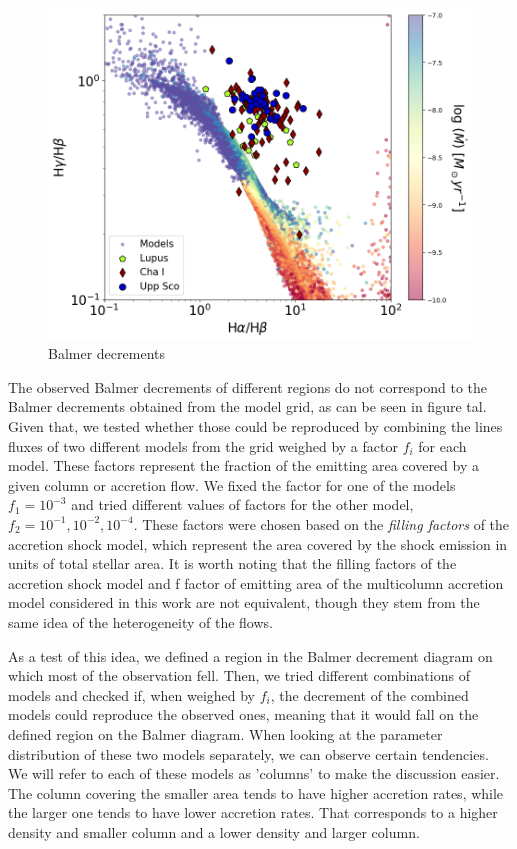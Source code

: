 \documentclass[twocolumn,linenumbers]{aastex631}
\begin{document}
\begin{figure}
    \centering
    \includegraphics[width=0.8\linewidth]{figures/BalmerDecrements.png}
    \caption{Balmer decrements}
    \label{fig:balmer_decrement}
\end{figure}

The observed Balmer decrements of different regions do not correspond to the Balmer decrements obtained from the model grid, as can be seen in figure tal. Given that, we tested whether those could be reproduced by combining the lines fluxes of two different models from the grid weighed by a factor $f_i$ for each model. These factors represent the fraction of the emitting area covered by a given column or accretion flow. We fixed the factor for one of the models $f_1=10^{-3}$ and tried different values of factors for the other model, $f_2 = 10^{-1},10^{-2},10^{-4}$. These factors were chosen based on the \textit{filling factors} of the accretion shock model, which represent the area covered by the shock emission in units of total stellar area. It is worth noting that the filling factors of the accretion shock model and f factor of emitting area of the multicolumn accretion model considered in this work are not equivalent, though they stem from the same idea of the heterogeneity of the flows. 

As a test of this idea, we defined a region in the Balmer decrement diagram on which most of the observation fell. Then, we tried different combinations of models and checked if, when weighed by $f_i$, the decrement of the combined models could reproduce the observed ones, meaning that it would fall on the defined region on the Balmer diagram. When looking at the parameter distribution of these two models separately, we can observe certain tendencies. We will refer to each of these models as 'columns' to make the discussion easier. The column covering the smaller area tends to have higher accretion rates, while the larger one tends to have lower accretion rates. That corresponds to a higher density and smaller column and a lower density and larger column.
\end{document}
